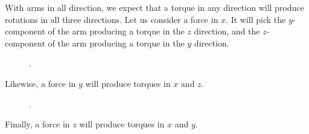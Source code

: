 With arms in all direction, we expect that a torque in any direction will produce rotations in all three directions. Let us consider a force in $x$. It will pick the $y$-component of the arm producing a torque in the $z$ direction, and the $z$-component of the arm producing a torque in the $y$ direction.  

\begin{figure}
  \begin{center}
  \end{center}
  \caption[]{.}
  \label{fig:tensor20}
\end{figure}


Likewise, a force in $y$ will produce torques in $x$ and $z$. 

\begin{figure}
  \begin{center}
  \end{center}
  \caption[]{.}
  \label{fig:tensor21}
\end{figure}


Finally, a force in $z$ will produce torques in $x$ and $y$. 

